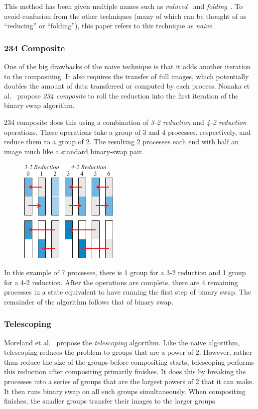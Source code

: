 \documentclass{vgtc}                          %
\newcommand*{\lcite}[1]{~\cite{#1}}
\newcommand*{\scite}[1]{~\cite{#1}}
\newcommand{\etal}{et al.\xspace}
\newcommand*{\keyterm}[1]{\emph{#1}}
\newcommand*{\textalgorithm}[1]{\textsf{#1}\xspace}
\newcommand{\naive}{\textalgorithm{naive}}
\newcommand{\telescoping}{\textalgorithm{telescoping}}
\newcommand{\ttfcomposite}{\textalgorithm{234 composite}}
\newcommand{\Ttfcomposite}{\textalgorithm{234 composite}}
\begin{document}
This method has been given multiple names such as \keyterm{reduced}\lcite{23Swap} and \keyterm{folding}\lcite{Moreland2011:SC}.
To avoid confusion from the other techniques (many of which can be thought of as ``reducing'' or ``folding''), this paper refers to this technique as \keyterm{\naive}.

\subsubsection{234 Composite}

One of the big drawbacks of the \naive technique is that it adds another iteration to the compositing.
It also requires the transfer of full images, which potentially doubles the amount of data transferred or computed by each process.
Nonaka \etal\scite{Nonaka2015,Nonaka2018} propose \keyterm{\ttfcomposite} to roll the reduction into the first iteration of the binary swap algorithm.

\Ttfcomposite does this using a combination of \keyterm{3-2 reduction} and \keyterm{4-2 reduction} operations.
These operations take a group of 3 and 4 processes, respectively, and reduce them to a group of 2.
The resulting 2 processes each end with half an image much like a standard binary-swap pair.

\begin{figure}
  \includegraphics[scale=.75]{234-composite-6-proc}
\end{figure}
In this example of 7 processes, there is 1 group for a 3-2 reduction and 1 group for a 4-2 reduction.
After the operations are complete, there are 4 remaining processes in a state equivalent to have running the first step of binary swap.
The remainder of the algorithm follows that of binary swap.

\subsubsection{Telescoping}

Moreland \etal\scite{Moreland2011:SC} propose the \keyterm{\telescoping} algorithm.
Like the \naive algorithm, \telescoping reduces the problem to groups that are a power of 2.
However, rather than reduce the size of the groups before compositing starts, \telescoping performs this reduction after compositing primarily finishes.
It does this by breaking the processes into a series of groups that are the largest powers of 2 that it can make.
It then runs binary swap on all such groups simultaneously.
When compositing finishes, the smaller groups transfer their images to the larger groups.
\end{document}
